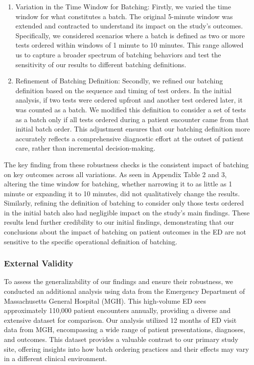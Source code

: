 \documentclass{article}
\begin{document}
\begin{enumerate}
\def\labelenumi{(\arabic{enumi})}
\item
  Variation in the Time Window for Batching: Firstly, we varied the time
  window for what constitutes a batch. The original 5-minute window was
  extended and contracted to understand its impact on the study's
  outcomes. Specifically, we considered scenarios where a batch is
  defined as two or more tests ordered within windows of 1 minute to 10
  minutes. This range allowed us to capture a broader spectrum of
  batching behaviors and test the sensitivity of our results to
  different batching definitions.
\item
  Refinement of Batching Definition: Secondly, we refined our batching
  definition based on the sequence and timing of test orders. In the
  initial analysis, if two tests were ordered upfront and another test
  ordered later, it was counted as a batch. We modified this definition
  to consider a set of tests as a batch only if all tests ordered during
  a patient encounter came from that initial batch order. This
  adjustment ensures that our batching definition more accurately
  reflects a comprehensive diagnostic effort at the outset of patient
  care, rather than incremental decision-making.
\end{enumerate}

The key finding from these robustness checks is the consistent impact of
batching on key outcomes across all variations. As seen in Appendix
Table 2 and 3, altering the time window for batching, whether narrowing
it to as little as 1 minute or expanding it to 10 minutes, did not
qualitatively change the results. Similarly, refining the definition of
batching to consider only those tests ordered in the initial batch also
had negligible impact on the study's main findings. These results lend
further credibility to our initial findings, demonstrating that our
conclusions about the impact of batching on patient outcomes in the ED
are not sensitive to the specific operational definition of batching.

\hypertarget{external-validity}{%
\subsubsection{External Validity}\label{external-validity}}

To assess the generalizability of our findings and ensure their
robustness, we conducted an additional analysis using data from the
Emergency Department of Massachusetts General Hospital (MGH). This
high-volume ED sees approximately 110,000 patient encounters annually,
providing a diverse and extensive dataset for comparison. Our analysis
utilized 12 months of ED visit data from MGH, encompassing a wide range
of patient presentations, diagnoses, and outcomes. This dataset provides
a valuable contrast to our primary study site, offering insights into
how batch ordering practices and their effects may vary in a different
clinical environment.
\end{document}
